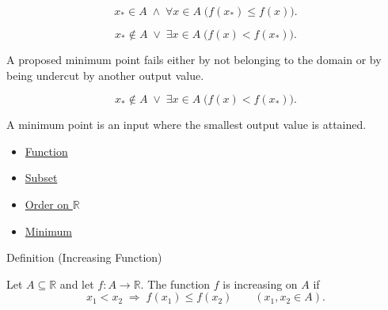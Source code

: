 \begin{remark*}
\[
  x_*\in A\;\wedge\;\forall x\in A\;\bigl(f(x_*)\leq f(x)\bigr).
\]
\end{remark*}

\begin{remark*}
\[
  x_*\notin A\;\vee\;\exists x\in A\;\bigl(f(x)<f(x_*)\bigr).
\]
\end{remark*}

\begin{remark*}
A proposed minimum point fails either by not belonging to the domain or by
being undercut by another output value.
\end{remark*}

\begin{remark*}
\[
  x_*\notin A
  \;\vee\;
  \exists x\in A\;\bigl(f(x)<f(x_*)\bigr).
\]
\end{remark*}

\begin{remark*}[Interpretation]
A minimum point is an input where the smallest output value is attained.
\end{remark*}

\begin{dependencies}
\begin{itemize}
  \item \hyperref[def:function]{Function}
  \item \hyperref[def:subset]{Subset}
  \item \hyperref[def:order-on-r]{Order on $\mathbb{R}$}
  \item \hyperref[def:minimum]{Minimum}
\end{itemize}
\end{dependencies}


\begin{definitionbox}{Definition (Increasing Function)}
\begin{definition}
\label{def:function-increasing}
Let $A\subseteq\mathbb{R}$ and let $f:A\to\mathbb{R}$.  The function
$f$ is increasing on $A$ if
\[
  x_1<x_2\;\Longrightarrow\;f(x_1)\leq f(x_2)
  \qquad (x_1,x_2\in A).
\]
\end{definition}
\end{definitionbox}


